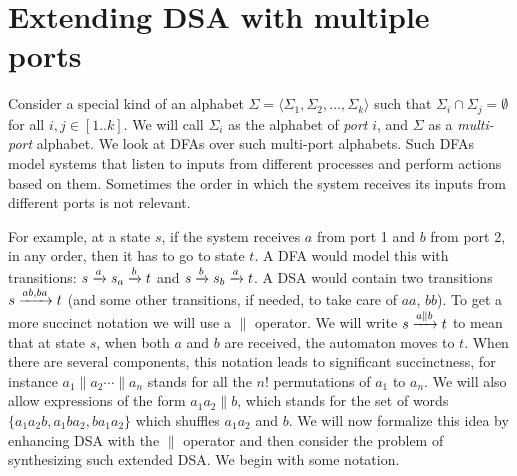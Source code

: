 \section{Extending DSA with multiple ports}

Consider a special kind of an alphabet
$\Sigma = \langle \Sigma_1, \Sigma_2, \dots, \Sigma_k \rangle$ such
that $\Sigma_i \cap \Sigma_j = \emptyset$ for all $i, j \in
[1..k]$. We will call $\Sigma_i$ as the alphabet of \emph{port} $i$,
and $\Sigma$ as a \emph{multi-port} alphabet. We
look at DFAs over such multi-port alphabets. Such DFAs model systems
that listen to inputs from different processes and perform actions
based on them. Sometimes the order in which the system receives its
inputs from different ports is not relevant.%
  
For example, at a state
$s$, if the system receives $a$ from port 1 and $b$ from port 2, in any
order, then it has to go to state $t$.  A DFA would model this with
transitions: $s \xrightarrow{a} s_a \xrightarrow{b} t$ and $s \xrightarrow{b} s_b \xrightarrow{a}
t$. A DSA would contain two transitions $s \xrightarrow{ab, ba} t$ (and some
other transitions, if needed, to take care of $aa$, $bb$). To get a
more succinct notation we will use a $\parallel$ operator. We will
write $s \xrightarrow{a \parallel b} t$ to mean that at state $s$, when
both $a$ and $b$ are received, the automaton moves to $t$. When there
are several components, this notation leads to significant
succinctness, for instance $a_1 \parallel a_2 \cdots \parallel a_n$
stands for all the $n!$ permutations of $a_1$ to $a_n$. We will also
allow expressions of the form $a_1 a_2 \parallel b$, which stands for
the set of words $\{a_1 a_2 b, a_1 b a_2, b a_1 a_2\}$ which shuffles
$a_1a_2$ and $b$. We will now formalize this idea by enhancing DSA with
the $\parallel$ operator and then consider the problem of synthesizing
such extended DSA. We begin with some notation.%






